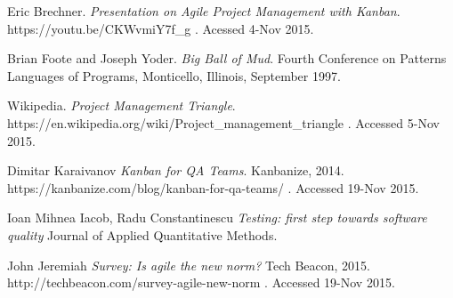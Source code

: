 \documentclass[conference]{IEEEtran}
\begin{document}
{
  Eric Brechner.
  \emph{Presentation on Agile Project Management with Kanban}.
  https://youtu.be/CKWvmiY7f\_g .
  Acessed 4-Nov 2015.

Brian Foote and Joseph Yoder. \emph{Big Ball of Mud}. Fourth Conference on Patterns Languages of Programs, Monticello, Illinois, September 1997.

Wikipedia. \emph{Project Management Triangle}.
https://en.wikipedia.org/wiki/Project\_management\_triangle .
Accessed 5-Nov 2015.

  Dimitar Karaivanov
  \emph{Kanban for QA Teams}.
  Kanbanize, 2014.
  https://kanbanize.com/blog/kanban-for-qa-teams/ .
  Accessed 19-Nov 2015.

  Ioan Mihnea Iacob, Radu Constantinescu
  \emph{Testing: first step towards software quality}
  Journal of Applied Quantitative Methods.

  John Jeremiah
  \emph{Survey: Is agile the new norm?}
  Tech Beacon, 2015.
  http://techbeacon.com/survey-agile-new-norm .
  Accessed 19-Nov 2015.
}






%




\end{document}
